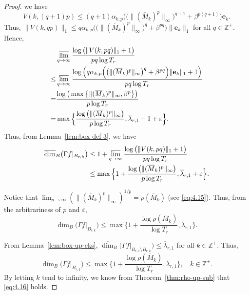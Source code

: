 \documentclass[11pt]{amsart}
\theoremstyle{definition}
\theoremstyle{remark}
\numberwithin{equation}{section}
\newcommand{\Z}{{\mathbb Z}}
\newcommand{\bfe}{{\mathbf e}}
\newcommand{\upM}{{\overline{M}}}
\newcommand{\uplam}{{\overline{\lambda}}}
\def\vep{\varepsilon}
\def\updimB{\overline{\dim}_B}
\begin{document}
\begin{proof}
	we have 
	\[
	V(k,(q+1)p) \leq (q+1) \alpha_{k,p}\Big( \big( \lVert(\upM_k)^{p}\rVert_\infty \big)^{q+1} + {\beta}^{p(q+1)} \Big)  \bfe_{k} .
	\]
	Thus, 
	$
	\lVert V(k,qp) \rVert_1 
	\leq q \alpha_{k,p} \big( \big( \lVert(\upM_k)^{p}\rVert_\infty \big)^q + {\beta}^{pq} \big)  \lVert  \bfe_{k} \rVert_1
	$
	for all $q \in \Z^+$.
	Hence, 
	\begin{align*}
		& \varlimsup_{q \to \infty} \frac{\log \big( \lVert V(k,pq) \rVert_1 +1\big)}{pq \log T_r} \\
		\leq & \varlimsup_{q \to \infty} \frac{\log \Big( q \alpha_{k,p}\Big( \big( \lVert(\upM_k)^{p}\rVert_\infty \big)^q + {\beta}^{pq} \Big)  \lVert  \bfe_{k} \rVert_1+1\Big)}{p q\log T_r} \\
		= &  \frac{\log \big( \max\big\{   \lVert (\upM_k)^{p}\rVert_\infty  , \beta^p \big\}\big)}{p \log T_r} \\
		= & \max\Big\{  \frac{\log   \big( \lVert (\upM_k)^{p} \rVert_\infty \big) }{p \log T_r}, \uplam_{r,1}-1+\vep \Big\}.
	\end{align*}
	Thus, from Lemma~\ref{lem:box-def-3}, we have
	\begin{align*}
		\updimB \big(\Gamma f|_{B_{r,k}}\big) 	
		&\leq 1+\varlimsup_{q \to \infty} \frac{\log \big( \lVert V(k,pq) \rVert_1 +1\big)}{pq \log T_r} \\
		&\leq \max\Big\{ 1+ \frac{\log   \big( \lVert(\upM_k)^{p}\rVert_\infty \big)  }{p \log T_r}, \uplam_{r,1}+\vep \Big\}.
	\end{align*}
	
	Notice that $\lim_{p\to\infty} (\rVert (\upM_k)^p\|_\infty)^{1/p}=\rho(\upM_k)$ (see \eqref{eq:4.15}). Thus, from the arbitrariness of $p$ and $\vep$,
	\begin{equation*}%
		\updimB\big(\Gamma f|_{B_{r,k}}\big) 	
		\leq\max\Big\{  1+ \frac{\log  \rho(\upM_{k})  }{ \log T_r},  \uplam_{r,1}\Big\}.
	\end{equation*}
	
	
	From Lemma~\ref{lem:box-up-eks},
	$
	\updimB\big(\Gamma f|_{ B_{r,1} \setminus B_{r,k}}\big) 		\leq \uplam_{r,1}
	$
	for all $k \in \Z^+$. Thus, 
	\[
	\updimB \big(\Gamma f|_{B_{r,1} }\big) 	
	\leq\max\Big\{  1+ \frac{\log  \rho(\upM_{k})  }{ \log T_r},  \uplam_{r,1}\Big\}, \quad  k \in \Z^+.
	\]
	By letting $k$ tend to infinity, we know from Theorem~\ref{thm:rho-up-sub} that \eqref{eq:4.16} holds.
\end{proof}
\end{document}
